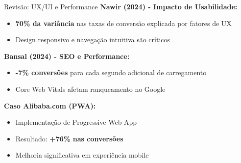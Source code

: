 \documentclass{beamer}
\begin{document}
    \begin{frame}{Revisão: UX/UI e Performance}
        \textbf{Nawir (2024) - Impacto de Usabilidade:}
        \begin{itemize}
            \item \textbf{70\% da variância} nas taxas de conversão explicada por fatores de UX
            \item Design responsivo e navegação intuitiva são críticos
        \end{itemize}

        \vspace{0.3cm}

        \textbf{Bansal (2024) - SEO e Performance:}
        \begin{itemize}
            \item \textbf{-7\% conversões} para cada segundo adicional de carregamento
            \item Core Web Vitals afetam ranqueamento no Google
        \end{itemize}

        \vspace{0.3cm}

        \textbf{Caso Alibaba.com (PWA):}
        \begin{itemize}
            \item Implementação de Progressive Web App
            \item Resultado: \textbf{+76\% nas conversões}
            \item Melhoria significativa em experiência mobile
        \end{itemize}
    \end{frame}
\end{document}
